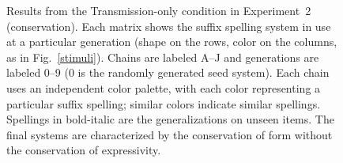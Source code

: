 \documentclass[doc,biblatex]{apa7}
\begin{document}
	\begin{figure}
	\vspace*{2pt}
	\caption{Results from the Transmission-only condition in Experiment~2 (conservation). Each matrix shows the suffix spelling system in use at a particular generation (shape on the rows, color on the columns, as in Fig.~\ref{stimuli}). Chains are labeled A--J and generations are labeled 0–9 (0 is the randomly generated seed system). Each chain uses an independent color palette, with each color representing a particular suffix spelling; similar colors indicate similar spellings. Spellings in bold-italic are the generalizations on unseen items. The final systems are characterized by the conservation of form without the conservation of expressivity.}
	\label{con_lrn}
	\end{figure}
\end{document}
